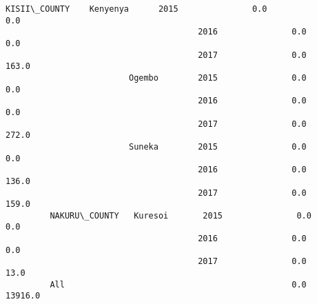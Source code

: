 \documentclass[11pt]{article}
\begin{document}
\begin{Verbatim}[commandchars=\\\{\}]
         KISII\_COUNTY    Kenyenya      2015               0.0               0.0   
                                       2016               0.0               0.0   
                                       2017               0.0             163.0   
                         Ogembo        2015               0.0               0.0   
                                       2016               0.0               0.0   
                                       2017               0.0             272.0   
                         Suneka        2015               0.0               0.0   
                                       2016               0.0             136.0   
                                       2017               0.0             159.0   
         NAKURU\_COUNTY   Kuresoi       2015               0.0               0.0   
                                       2016               0.0               0.0   
                                       2017               0.0              13.0   
         All                                              0.0           13916.0   
         

\end{Verbatim}
\end{document}
